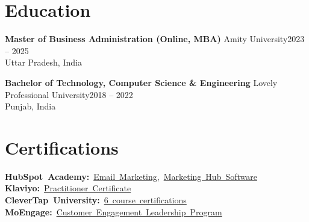 \documentclass[10pt,a4paper]{article}
\newcommand{\educationentry}[4]{\vspace{3pt}\noindent\textbf{#2} \textbar{} #1\hfill{\footnotesize #4}\\[0.5pt]{\footnotesize #3}\par\vspace{1pt}}
\begin{document}
\section*{Education}
\educationentry{Amity University}{Master of Business Administration (Online, MBA)}{Uttar Pradesh, India}{2023 -- 2025}
\educationentry{Lovely Professional University}{Bachelor of Technology, Computer Science \& Engineering}{Punjab, India}{2018 -- 2022}

\section*{Certifications}
{\raggedright
\mbox{\textbf{HubSpot Academy:} \href{https://app-eu1.hubspot.com/academy/achievements/21t8q7l5/en/1/shadab-khan/email-marketing-certified}{Email Marketing}, \href{https://app-eu1.hubspot.com/academy/achievements/hsdj9gyt/en/1/shadab-khan/hubspot-marketing-hub-software-certified}{Marketing Hub Software}} \textbar{}
\mbox{\textbf{Klaviyo:} \href{https://credential.klaviyo.com/0d831839-a4a6-4e54-926c-9dbbf1fc332e}{Practitioner Certificate}} \textbar{}
\mbox{\textbf{CleverTap University:} \href{https://www.verix.io/credential/46caec87-4e18-46b3-b5f1-2bcb463237f5}{6 course certifications}} \textbar{}
\mbox{\textbf{MoEngage:} \href{https://www.credential.net/3313639f-ca8e-48e5-9d5a-def59842c7fe}{Customer Engagement Leadership Program}}\par}
\end{document}
